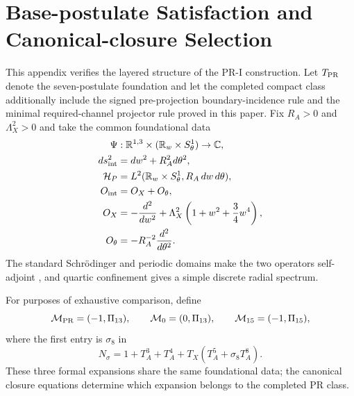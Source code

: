 \appendix
\section{Base-postulate Satisfaction and Canonical-closure Selection}
\label{app:axiom-by-axiom}

This appendix verifies the layered structure of the PR-I construction.  Let $T_{\rm PR}$ denote the seven-postulate foundation and let the completed compact class additionally include the signed pre-projection boundary-incidence rule and the minimal required-channel projector rule proved in this paper.  Fix $R_A>0$ and $\Lambda_X^2>0$ and take the common foundational data
\begin{align}
 \Psi&:\mathbb R^{1,3}\times(\mathbb R_w\times S^1_\theta)\to\mathbb C,\\
 ds_{\rm int}^2&=dw^2+R_A^2d\theta^2,\\
 \mathcal H_P&=L^2(\mathbb R_w\times S^1_\theta,R_A\,dw\,d\theta),\\
 O_{\rm int}&=O_X+O_\theta,\\
 O_X&=-\frac{d^2}{dw^2}+\Lambda_X^2\left(1+w^2+\frac34w^4\right),\\
 O_\theta&=-R_A^{-2}\frac{d^2}{d\theta^2}.
\end{align}
The standard Schr\"odinger and periodic domains make the two operators self-adjoint \cite{ReedSimon_1975}, and quartic confinement gives a simple discrete radial spectrum.

For purposes of exhaustive comparison, define
\begin{equation}
 \mathcal M_{\rm PR}=(-1,\Pi_{13}),\qquad
 \mathcal M_{0}=(0,\Pi_{13}),\qquad
 \mathcal M_{15}=(-1,\Pi_{15}),
\end{equation}
where the first entry is $\sigma_8$ in
\begin{equation}
 N_\sigma=1+T_A^3+T_A^4+T_X(T_A^5+\sigma_8T_A^8).
\end{equation}
These three formal expansions share the same foundational data; the canonical closure equations determine which expansion belongs to the completed PR class.


